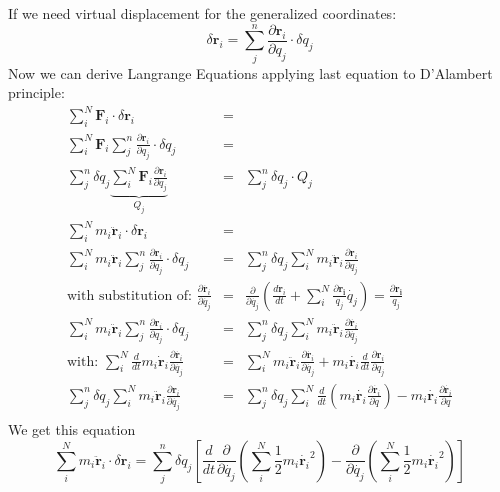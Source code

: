 If we need virtual displacement for the generalized coordinates:
\begin{equation}
	\delta\mathbf{r}_i = \sum_j^n{\frac{\partial\mathbf{r}_i}{\partial q_j}\cdot \delta q_j}
\end{equation}
Now we can derive Langrange Equations applying last equation to D'Alambert principle:
\begin{eqnarray*}
\sum_i^N{\mathbf{F}_i \cdot \delta \mathbf{r}_i} &=& \\ \sum_i^N{\mathbf{F}_i\sum_j^n{\frac{\partial\mathbf{r}_i}{\partial q_j}\cdot \delta q_j}}&=&\\
\sum_j^n{\delta q_j\underbrace{\sum_i^N{\mathbf{F}_i}\frac{\partial\mathbf{r}_i}{\partial q_j}}_\text{$Q_j$}}&=&\boxed{\sum_j^n{\delta q_j\cdot Q_j}}\\
\sum_i^N{m_i\ddot{\mathbf{r}}_i \cdot \delta \mathbf{r}_i}&=&\\
\sum_i^N{m_i\ddot{\mathbf{r}}_i \sum_j^n{\frac{\partial\mathbf{r}_i}{\partial q_j}\cdot \delta q_j}}&=&
\sum_j^n{\delta q_j\sum_i^N{m_i\ddot{\mathbf{r}}_i\frac{\partial\mathbf{r}_i}{\partial q_j}}}\\
\text{with substitution of: } \frac{\partial\dot{\mathbf{r}_i}}{\partial \dot{q_j}} &=& \frac{\partial}{\partial \dot{q_j}}\left(\frac{d\mathbf{r}_i}{dt} + \sum^N_i{\frac{\partial \mathbf{r_i}}{q_j}\dot{q_j}}\right) = \frac{\partial \mathbf{r_i}}{q_j}\\
\sum_i^N{m_i\ddot{\mathbf{r}}_i \sum_j^n{\frac{\partial\mathbf{r}_i}{\partial q_j}\cdot \delta q_j}}&=&
\sum_j^n{\delta q_j\sum_i^N{m_i\ddot{\mathbf{r}}_i\frac{\partial\dot{\mathbf{r}_i}}{\partial \dot{q_j}}}}\\
\text{with: }\sum_i^N{\frac{d}{dt}m_i\dot{\mathbf{r}}_i\frac{\partial\dot{\mathbf{r}_i}}{\partial \dot{q_j}}} &=& \sum_i^N{m_i\ddot{\mathbf{r}}_i\frac{\partial\dot{\mathbf{r}_i}}{\partial \dot{q_j}}+m_i\dot{\mathbf{r}_i}\frac{d}{dt}\frac{\partial \mathbf{r}_i}{\partial q_j}}\\
\sum_j^n{\delta q_j\sum_i^N{m_i\ddot{\mathbf{r}}_i\frac{\partial\mathbf{r}_i}{\partial \dot{q_j}}}} &=& \sum_j^n{\delta q_j\sum_i^N{\frac{d}{dt}\left(m_i\dot{\mathbf{r}_i}\frac{\partial\dot{\mathbf{r}_i}}{\partial \dot{q}}\right)-m_i\dot{\mathbf{r}_i}\frac{\partial\dot{\mathbf{r}_i}}{\partial q}}}\\
\end{eqnarray*}
We get this equation
\begin{equation}
\boxed{\sum_i^N{m_i\ddot{\mathbf{r}}_i \cdot \delta \mathbf{r}_i} =\sum_j^n{\delta q_j\left[\frac{d}{dt}\frac{\partial}{\partial \dot{q_j}}\left(\sum_i^N\frac{1}{2}m_i\dot{\mathbf{r}_i}^2\right)-\frac{\partial}{\partial \dot{q_j}}\left(\sum_i^N\frac{1}{2}m_i\dot{\mathbf{r}_i}^2\right)\right]}}
\end{equation}
